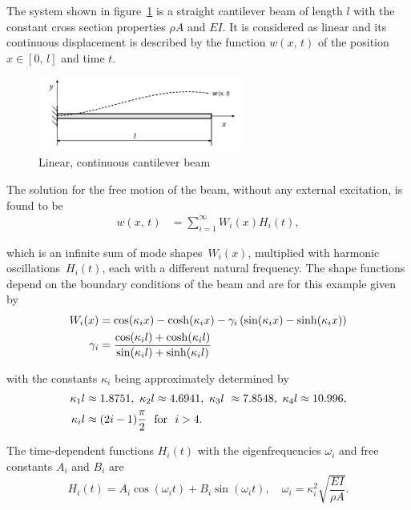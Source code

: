 The system shown in figure~\ref{fig:verification:linear-continuous-beam} is a straight cantilever beam of length $l$ with the constant cross section properties $\rho A$ and $EI$.
It is considered as linear and its continuous displacement is described by the function $w(x,\,t)$ of the position $x \in [0,\,l]$ and time $t$.

\begin{figure}[h]
\centering
\includegraphics[width=0.6\textwidth]{figures/verification/linear-continuous-beam.png}
\caption{Linear, continuous cantilever beam}
\label{fig:verification:linear-continuous-beam}
\end{figure}

The solution for the free motion of the beam, without any external excitation, is found to be
%
\begin{align}
w(x,\,t) &= \sum_{i=1}^{\infty} W_{i}(x)H_{i}(t), \label{eq:linear-continuous-beam-w}
\end{align}

which is an infinite sum of mode shapes~$W_{i}(x)$, multiplied with harmonic oscillations~$H_{i}(t)$, each with a different natural frequency.
The shape functions depend on the boundary conditions of the beam and are for this example given by
%
\begin{align}
W_{i}(x) &= \cos(\kappa_{i}x) - \cosh(\kappa_{i}x) - \gamma_{i} \left( \sin(\kappa_{i}x) - \sinh(\kappa_{i}x) \right) \\
\gamma_{i} &= \frac{\cos(\kappa_{i}l) + \cosh(\kappa_{i}l)}{\sin(\kappa_{i}l) + \sinh(\kappa_{i}l)} \notag
\end{align}

with the constants $\kappa_{i}$ being approximately determined by    %
%
\begin{align}
\kappa_{1}l &\approx 1.8751,\ \kappa_{2}l \approx 4.6941,\ \kappa_{3}l\ \approx 7.8548,\ \kappa_{4}l \approx 10.996, \\
\kappa_{i}l &\approx (2i - 1)\frac{\pi}{2}\ \ \mathrm{for}\ \ i > 4. \notag
\end{align}

The time-dependent functions $H_{i}(t)$ with the eigenfrequencies $\omega_{i}$ and free constants $A_{i}$ and $B_{i}$ are
%
\begin{equation}
H_{i}(t) = A_{i}\cos(\omega_{i}t) + B_{i}\sin(\omega_{i}t),\quad \omega_{i} = \kappa_{i}^2 \sqrt{\frac{EI}{\rho A}}.
\end{equation}


